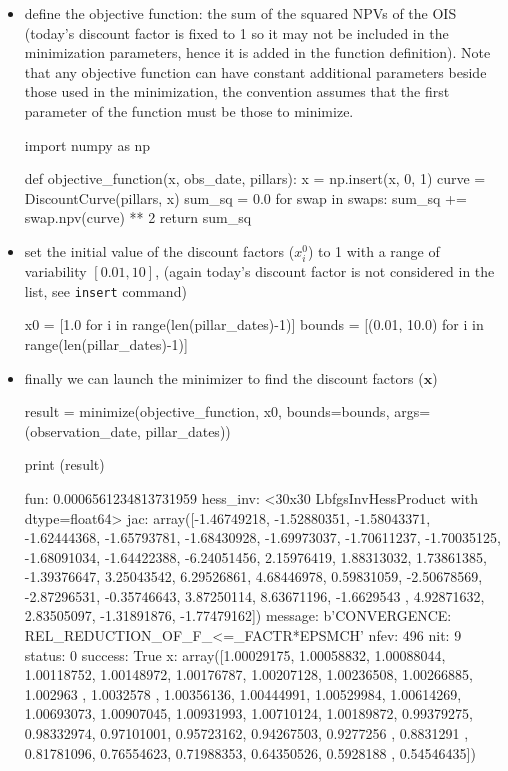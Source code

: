 \begin{itemize}
\tightlist
\item
  define the objective function: the sum of the squared NPVs of the OIS (today's discount factor is fixed to 1 so it may not be included in the minimization parameters, hence it is added in the function definition). Note that any objective function can have constant additional parameters beside those used in the minimization, the convention assumes that the first parameter of the function must be those to minimize. 

\begin{ipython}
import numpy as np

def objective_function(x, obs_date, pillars):
    x = np.insert(x, 0, 1)
    curve = DiscountCurve(pillars, x)
    sum_sq = 0.0
    for swap in swaps:
        sum_sq += swap.npv(curve) ** 2
    return sum_sq
\end{ipython}

\item
  set the initial value of the discount factors (\(x_i^0\)) to 1 with a
  range of variability \([ 0.01, 10]\), (again today's discount factor is not considered 
  in the list, see \texttt{insert} command)

\begin{ipython}
x0 = [1.0 for i in range(len(pillar_dates)-1)]
bounds = [(0.01, 10.0) for i in range(len(pillar_dates)-1)]
\end{ipython}

\item
  finally we can launch the minimizer to find the discount factors
  (\(\mathbf{x}\))

\begin{ipython}
result = minimize(objective_function, x0, bounds=bounds,
                  args=(observation_date, pillar_dates))

print (result)
\end{ipython}
\begin{ioutput}
      fun: 0.0006561234813731959
 hess_inv: <30x30 LbfgsInvHessProduct with dtype=float64>
      jac: array([-1.46749218, -1.52880351, -1.58043371, -1.62444368,
                  -1.65793781, -1.68430928, -1.69973037, -1.70611237, 
                  -1.70035125, -1.68091034, -1.64422388, -6.24051456,  
                   2.15976419,  1.88313032,  1.73861385, -1.39376647,  
                   3.25043542,  6.29526861,  4.68446978,  0.59831059,
                  -2.50678569, -2.87296531, -0.35746643,  3.87250114,  
                   8.63671196, -1.6629543 ,  4.92871632,  2.83505097, 
                  -1.31891876, -1.77479162])
  message: b'CONVERGENCE: REL_REDUCTION_OF_F_<=_FACTR*EPSMCH'
     nfev: 496
      nit: 9
   status: 0
  success: True
  x: array([1.00029175, 1.00058832, 1.00088044, 1.00118752,
  1.00148972, 1.00176787, 1.00207128, 1.00236508, 1.00266885,
  1.002963  , 1.0032578 , 1.00356136, 1.00444991, 1.00529984,
  1.00614269, 1.00693073, 1.00907045, 1.00931993, 1.00710124,
  1.00189872, 0.99379275, 0.98332974, 0.97101001, 0.95723162,
  0.94267503, 0.9277256 , 0.8831291 , 0.81781096, 0.76554623,
  0.71988353, 0.64350526, 0.5928188 , 0.54546435])
\end{ioutput}
\end{itemize}

